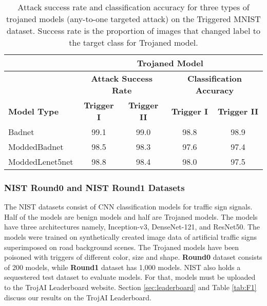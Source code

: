 \documentclass{article}
\begin{document}
 \begin{table}[h!]
        \centering
        \caption{Attack success rate and classification accuracy for three types of trojaned models (any-to-one targeted attack) on the Triggered MNIST dataset. Success rate is the proportion of images that changed label to the target class for Trojaned model.}
        \begin{tabular}{|l|c|c|c|c|}
        \hline
&  \multicolumn{4}{c|}{\textbf{Trojaned Model}}  \\
        \hline

         & \multicolumn{2}{c|}{\textbf{Attack Success Rate}} & \multicolumn{2}{c|}{\textbf{Classification Accuracy}} \\
        \hline
         \textbf{Model Type} & \textbf{Trigger I} & \textbf{Trigger II}  & \textbf{Trigger I} & \textbf{Trigger II} \\
        \hline\hline
        Badnet  &99.1 & 99.0  & 98.8 & 98.9 \\
        ModdedBadnet &98.5 & 98.3 & 97.6 & 97.4\\
        ModdedLenet5net &98.8 & 98.4 & 98.0 & 97.5 \\
\hline
    \end{tabular}
        \label{tab:MNIST_model-B}\end{table}








\hfill








\newpage

\subsubsection*{NIST Round0 and NIST Round1 Datasets}
\label{sec:nist_data}
The NIST datasets consist of CNN classification models for traffic sign signals. Half of the models are benign models and half are Trojaned models. The models have three architectures namely, Inception-v3, DenseNet-121, and ResNet50. The models were trained on synthetically created image data of artificial traffic signs superimposed on road background scenes. The Trojaned models have been poisoned with triggers of different color, size and shape. \textbf{Round0} dataset consists of 200 models, while \textbf{Round1} dataset has 1,000 models. NIST also holds a sequestered test dataset to evaluate models. For that, models must be uploaded to the TrojAI Leaderboard website. Section \ref{sec:leaderboard} and Table \ref{tab:F1} discuss our results on the TrojAI Leaderboard.
\end{document}
